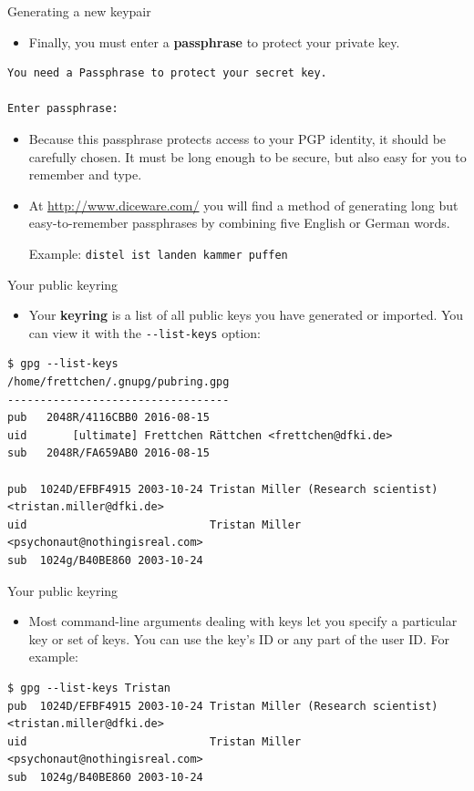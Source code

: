 \documentclass[%
mode=present,%
paper=smartboard,
size=20pt,
]{powerdot}
\newcommand\vsp{\vspace{-16mm}}
\newcommand{\clopt}[1]{\texttt{{-}#1}}
\begin{document}
\begin{slide}[method=direct,toc=]{Generating a new keypair}
  \begin{itemize}
  \item Finally, you must enter a \textbf{passphrase} to protect your
    private key.
  \end{itemize}
\vsp
\begin{verbatim}
You need a Passphrase to protect your secret key.    

Enter passphrase: 
\end{verbatim}

  \begin{itemize}
  \item Because this passphrase protects access to your PGP identity, it
    should be carefully chosen.  It must be long enough to be secure,
    but also easy for you to remember and type.
  \item At \url{http://www.diceware.com/} you will find a method of
    generating long but easy-to-remember passphrases by combining five
    English or German words.

    Example: \texttt{distel ist landen kammer puffen}
  \end{itemize}
\end{slide}

\begin{slide}[method=direct]{Your public keyring}
  \begin{itemize}
  \item Your \textbf{keyring} is a list of all public keys you have
    generated or imported.  You can view it with the
    \clopt{-list-keys} option:
  \end{itemize}
\begin{verbatim}
$ gpg --list-keys
/home/frettchen/.gnupg/pubring.gpg
----------------------------------
pub   2048R/4116CBB0 2016-08-15
uid       [ultimate] Frettchen Rättchen <frettchen@dfki.de>
sub   2048R/FA659AB0 2016-08-15

pub  1024D/EFBF4915 2003-10-24 Tristan Miller (Research scientist) <tristan.miller@dfki.de>
uid                            Tristan Miller <psychonaut@nothingisreal.com>
sub  1024g/B40BE860 2003-10-24
\end{verbatim}
\end{slide}

\begin{slide}[method=direct,toc=]{Your public keyring}
  \begin{itemize}
  \item Most command-line arguments dealing with keys let you specify
    a particular key or set of keys.  You can use the key's ID or any
    part of the user ID.  For example:
  \end{itemize}
\begin{verbatim}
$ gpg --list-keys Tristan
pub  1024D/EFBF4915 2003-10-24 Tristan Miller (Research scientist) <tristan.miller@dfki.de>
uid                            Tristan Miller <psychonaut@nothingisreal.com>
sub  1024g/B40BE860 2003-10-24
\end{verbatim}
\end{slide}
\end{document}
